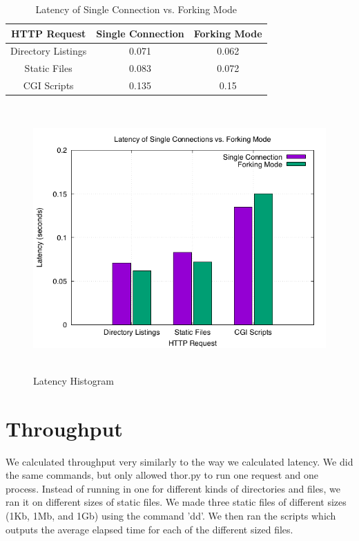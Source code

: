 \documentclass{article}
\begin{document}
        \begin{table}[H]
            \centering
            \begin{tabular}{c|c|c}
            \hline
                {\bf HTTP Request} & {\bf Single Connection} & {\bf Forking Mode} \\
            \hline
                Directory Listings & 0.071 & 0.062 \\
                Static Files & 0.083 & 0.072 \\
                CGI Scripts & 0.135 & 0.15 \\
            \hline 
            \end{tabular}
            \caption{Latency of Single Connection vs. Forking Mode}
            \label{tab:latency_table}
        \end{table}
        
        \begin{figure}[H]
            \centering
            \includegraphics[height=4in]{latency.png}
            \caption{Latency Histogram}
            \label{fig:latency_graph}
        \end{figure}
    
    \section*{Throughput}
    We calculated throughput very similarly to the way we calculated latency.  We did the same commands, but only allowed thor.py to run one request and one process.  Instead of running in one for different kinds of directories and files, we ran it on different sizes of static files.  We made three static files of different sizes (1Kb, 1Mb, and 1Gb) using the command 'dd'.  We then ran the scripts which outputs the average elapsed time for each of the different sized files.
        
\end{document}
